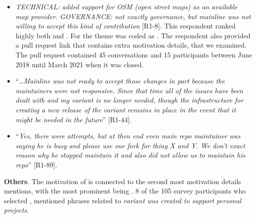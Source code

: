 \begin{itemize}[leftmargin=*]
\item \emph{TECHNICAL: added support for OSM (open street maps) as an available map provider. GOVERNANCE: not exactly governance, but mainline was not willing to accept this kind of contribution} [R1-8]. This respondent ranked highly both  and . For  the theme was coded as . The respondent also provided a \gh pull request link that contains extra motivation details, that we examined. The pull request contained 45 conversations and 15 participants between June 2018 until March 2021 when it was closed.

\item ``\emph{\ldots Mainline was not ready to accept those changes in part because the maintainers were not responsive. Since that time all of the issues have been dealt with and my variant is no longer needed, though the infrastructure for creating a new release of the variant remains in place in the event that it might be needed in the future}'' [R1-44].

\item ``\emph{Yes, there were attempts, but at then end even main repo maintainer was saying he is busy and please use our fork for thing X and Y. We don't exact reason why he stopped maintain it and also did not allow us to maintain his repo}'' [R1-89]. 


\end{itemize}


\nd \textbf{Others}. The motivation of  is connected to the second most motivation details mentions, with the most prominent being . 8 of the 105 survey participants who selected , mentioned phrases related to \emph{variant was created to support personal projects}.



